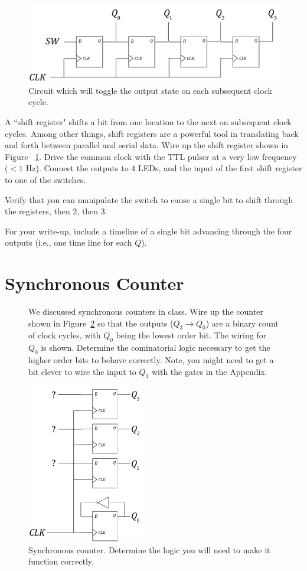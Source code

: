 \documentclass[12pt]{article}
\begin{document}
\begin{figure}[!h]
\centerline{\includegraphics[width=6in]{figs/shift_register.pdf}}
\caption{Circuit which will toggle the output state on each subsequent clock cycle.}
\label{fig:shift_register}
\end{figure}


A ``shift register" shifts a bit from one location to the next on subsequent clock cycles.  Among other things, shift registers are a powerful
tool in translating back and forth between parallel and serial data. Wire up the shift register shown in Figure ~\ref{fig:shift_register}.  
Drive the common clock with the TTL pulser at a very low frequency ($<1$ Hz).  Connect the outputs to 4 LEDs, and the input of the first
shift register to one of the switches.  

Verify that you can manipulate the switch to cause a single bit to shift through the registers, then 2, then 3.

For your write-up, include a timeline of a single bit advancing through the four outputs (i.e., one time line for each $Q$).  

\section*{Synchronous Counter}

\begin{figure}[!h]

We discussed synchronous counters in class.  Wire up the counter shown in Figure~\ref{fig:counter} so that the outputs ($Q_3\rightarrow Q_0$) are
a binary count of clock cycles, with $Q_0$ being the lowest order bit.  The wiring for $Q_0$ is shown.  Determine the cominatorial logic necessary
to get the higher order bits to behave correctly.  Note, you might need to get a bit clever to wire the input to $Q_3$ with the gates in the Appendix.


\centerline{\includegraphics[width=2in]{figs/counter.pdf}}
\caption{Synchronous counter. Determine the logic you will need to make it function correctly.}
\label{fig:counter}
\end{figure}
\end{document}

